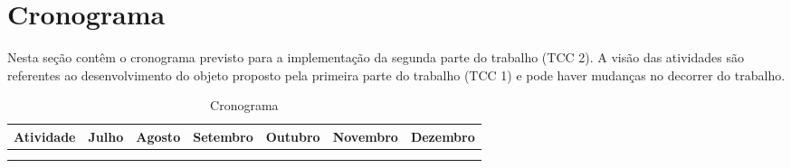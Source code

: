 \section{Cronograma}

Nesta seção contêm o cronograma previsto para a implementação da segunda
parte do trabalho (TCC 2). A visão das atividades são referentes ao
desenvolvimento do objeto proposto pela primeira parte do trabalho (TCC 1)
e pode haver mudanças no decorrer do trabalho.

\begin{table}[]
  \centering
  \caption{Cronograma}
  \label{cron:tab}
  \begin{tabular}{|l|l|l|l|l|l|l|}
    \hline
    Atividade & Julho  & Agosto & Setembro & Outubro & Novembro & Dezembro \\ \hline
    &  &  &  &  &  &  \\ \hline
    &  &  &  &  &  &  \\ \hline
  \end{tabular}
\end{table}
